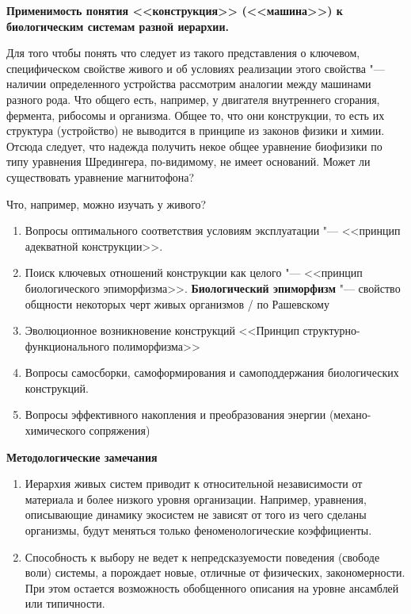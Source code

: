 \documentclass[12pt,a4paper,oneside]{book}
\begin{document}
\textbf{Применимость понятия <<конструкция>> (<<машина>>) к биологическим системам разной иерархии.}

Для того чтобы понять что следует из такого представления о ключевом, специфическом свойстве живого и об условиях реализации этого свойства "--- наличии определенного устройства рассмотрим аналогии между машинами разного рода. Что общего есть, например, у двигателя внутреннего сгорания, фермента, рибосомы и организма. Общее то, что они конструкции, то есть их структура (устройство) не выводится в принципе из законов физики и химии. Отсюда следует, что надежда получить некое общее уравнение биофизики по типу уравнения Шредингера, по-видимому, не имеет оснований. Может ли существовать уравнение магнитофона?

Что, например, можно изучать у живого?
\begin{enumerate}
\item Вопросы оптимального соответствия условиям эксплуатации "--- <<принцип адекватной конструкции>>.
\item Поиск ключевых отношений конструкции как целого "--- <<принцип биологического эпиморфизма>>.
\textbf{Биологический эпиморфизм} "--- свойство общности некоторых черт живых организмов / по Рашевскому
\item Эволюционное возникновение конструкций <<Принцип структурно-функционального полиморфизма>>
\item Вопросы самосборки, самоформирования и самоподдержания биологических конструкций.
\item Вопросы эффективного накопления и преобразования энергии (механо-химического сопряжения)
\end{enumerate}


\textbf{Методологические замечания}

\begin{enumerate}
\item Иерархия живых систем приводит к относительной независимости от материала и более низкого уровня организации. Например, уравнения, описывающие динамику экосистем не зависят от того из чего сделаны организмы, будут меняться только феноменологические коэффициенты.
\item Способность к выбору не ведет к непредсказуемости поведения (свободе воли) системы, а порождает новые, отличные от физических, закономерности. При этом остается возможность обобщенного описания на уровне ансамблей или типичности.
\end{enumerate}
\end{document}
